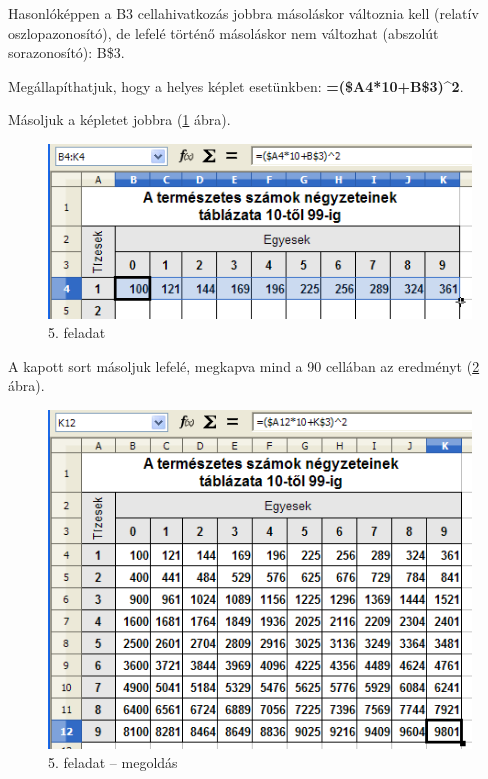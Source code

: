 Hasonlóképpen a B3 cellahivatkozás jobbra másoláskor
változnia kell (relatív oszlopazonosító), de lefelé
történő másoláskor nem változhat (abszolút
sorazonosító): B\$3.

Megállapíthatjuk, hogy a helyes képlet esetünkben:
\textsf{\textbf{\textcolor[rgb]{0.5019608,0.0,0.0}{=(\$A4*10+B\$3)\^{}2}}}.

Másoljuk a képletet jobbra (\ref{5-feladat-2} ábra).

\begin{figure}[!h]
\begin{center}
\includegraphics[width=12.275cm]{oocalcv2-img28.png}
\caption{5. feladat}\label{5-feladat-2}
\end{center}
\end{figure}

A kapott sort másoljuk lefelé, megkapva mind a 90 cellában az
eredményt (\ref{5-feladat-3} ábra).

\begin{figure}[!h]
\begin{center}
\includegraphics[width=12.222cm]{oocalcv2-img29.png}
\caption{5. feladat --  megoldás}\label{5-feladat-3}
\end{center}
\end{figure}

